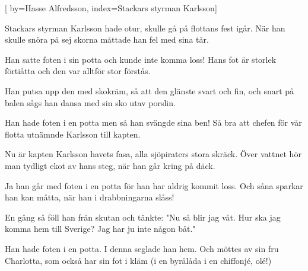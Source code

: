 


[ 	%
	by={Hasse Alfredsson},	%
	index={Stackars styrman Karlsson}]		%
	
\beginverse*		%
Stackars styrman Karlsson hade otur,
skulle gå på flottans fest igår.
När han skulle snöra på sej skorna
måttade han fel med sina tår.
\endverse			%

\beginverse*		%
Han satte foten i sin potta
och kunde inte komma loss!
Hans fot är storlek förtiåtta
och den var alltför stor förstås.
\endverse			%

\beginverse*		%
Han putsa upp den med skokräm,
så att den glänste svart och fin,
och snart på balen sågs han dansa
med sin sko utav porslin.
\endverse			%

\beginverse*		%
Han hade foten i en potta
men så han svängde sina ben!
Så bra att chefen för vår flotta
utnämnde Karlsson till kapten.
\endverse			%

\beginverse*		%
Nu är kapten Karlsson havets fasa,
alla sjöpiraters stora skräck.
Över vattnet hör man tydligt ekot
av hans steg, när han går kring på däck.
\endverse			%

\beginverse*		%
Ja han går med foten i en potta
för han har aldrig kommit loss.
Och såna sparkar han kan måtta,
när han i drabbningarna slåss!
\endverse			%

\beginverse*		%
En gång så föll han från skutan
och tänkte: "Nu så blir jag våt.
Hur ska jag komma hem till Sverige?
Jag har ju inte någon båt."
\endverse			%

\beginverse*		%
Han hade foten i en potta.
I denna seglade han hem.
Och möttes av sin fru Charlotta,
som också har sin fot i kläm
(i en byrålåda i en chiffonjé, olé!)
\endverse			%
\endsong			%
